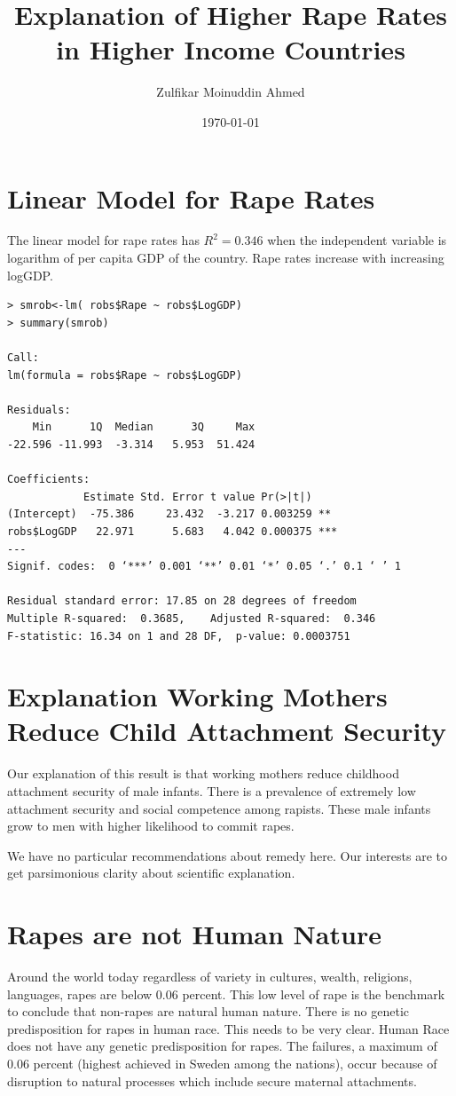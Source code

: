 \documentclass{amsart}
\title{Explanation of Higher Rape Rates in Higher Income Countries}
\author{Zulfikar Moinuddin Ahmed}
\date{\today}
\begin{document}
\maketitle

\section{Linear Model for Rape Rates}

The linear model for rape rates has $R^2=0.346$ when the independent variable is logarithm of per capita GDP of the country.  Rape rates increase with increasing logGDP.

\begin{verbatim}
> smrob<-lm( robs$Rape ~ robs$LogGDP)
> summary(smrob)

Call:
lm(formula = robs$Rape ~ robs$LogGDP)

Residuals:
    Min      1Q  Median      3Q     Max 
-22.596 -11.993  -3.314   5.953  51.424 

Coefficients:
            Estimate Std. Error t value Pr(>|t|)    
(Intercept)  -75.386     23.432  -3.217 0.003259 ** 
robs$LogGDP   22.971      5.683   4.042 0.000375 ***
---
Signif. codes:  0 ‘***’ 0.001 ‘**’ 0.01 ‘*’ 0.05 ‘.’ 0.1 ‘ ’ 1

Residual standard error: 17.85 on 28 degrees of freedom
Multiple R-squared:  0.3685,	Adjusted R-squared:  0.346 
F-statistic: 16.34 on 1 and 28 DF,  p-value: 0.0003751
\end{verbatim}

\section{Explanation Working Mothers Reduce Child Attachment Security}

Our explanation of this result is that working mothers reduce childhood attachment security of male infants.  There is a prevalence of extremely low attachment security and social competence among rapists.  These male infants grow to men with higher likelihood to commit rapes.

We have no particular recommendations about remedy here.  Our interests are to get parsimonious clarity about scientific explanation.

\section{Rapes are not Human Nature}

Around the world today regardless of variety in cultures, wealth, religions, languages, rapes are below 0.06 percent.  This low level of rape is the benchmark to conclude that non-rapes are natural human nature.  There is no genetic predisposition for rapes in human race.  This needs to be very clear.  Human Race does not have any genetic predisposition for rapes.  The failures, a maximum of 0.06 percent (highest achieved in Sweden among the nations), occur because of disruption to natural processes which include secure maternal attachments.
\end{document}
